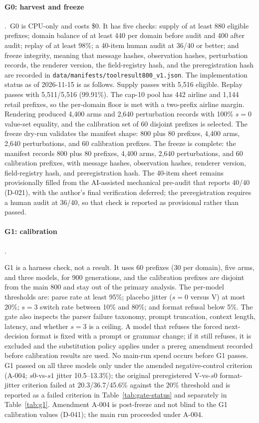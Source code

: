 \documentclass[a4paper,fleqn]{cas-sc}
\begin{document}
\paragraph{G0: harvest and freeze}.\
G0 is CPU-only and costs \$0. It has five checks: supply of at least 880 eligible prefixes;
domain balance of at least 440 per domain before audit and 400 after audit; replay of at least
98\%; a 40-item human audit at 36/40 or better; and freeze integrity, meaning that message hashes,
observation hashes, perturbation records, the renderer version, the field-registry hash, and the
preregistration hash are recorded in \texttt{data/manifests/toolresult800\_v1.json}.
The implementation status as of 2026-11-15 is as follows. Supply passes with 5{,}516 eligible.
Replay passes with 5{,}511/5{,}516 (99.91\%). The cap-10 pool has 442 airline and 1{,}144 retail
prefixes, so the per-domain floor is met with a two-prefix airline margin. Rendering produced
4{,}400 arms and 2{,}640 perturbation records with 100\% $s=0$ value-set equality, and the
calibration set of 60 disjoint prefixes is selected. The freeze dry-run validates the manifest
shape: 800 plus 80 prefixes, 4{,}400 arms, 2{,}640 perturbations, and 60 calibration prefixes.
The freeze is complete: the manifest records 800 plus 80 prefixes, 4,400 arms, 2,640 perturbations,
and 60 calibration prefixes, with message hashes, observation hashes, renderer version,
field-registry hash, and preregistration hash. The 40-item sheet remains provisionally filled from
the AI-assisted mechanical pre-audit that reports 40/40 (D-021), with the author's final
verification deferred; the preregistration requires a human audit at 36/40, so that check is
reported as provisional rather than passed.

\paragraph{G1: calibration}.\

G1 is a harness check, not a result. It uses 60 prefixes (30 per domain), five arms, and three
models, for 900 generations, and the calibration prefixes are disjoint from the main 800 and stay
out of the primary analysis. The per-model thresholds are: parse rate at least 95\%; placebo
jitter ($s=0$ versus V) at most 20\%; $s=3$ switch rate between 10\% and 80\%; and format refusal
below 5\%. The gate also inspects the parser failure taxonomy, prompt truncation, context length,
latency, and whether $s=3$ is a ceiling. A model that refuses the forced next-decision format is
fixed with a prompt or grammar change; if it still refuses, it is excluded and the substitution
policy applies under a prereg amendment recorded before calibration results are used. No
main-run spend occurs before G1 passes. G1 passed on all three models only under the amended
negative-control criterion (A-004; $s0$-vs-$s1$ jitter 10.5--13.3\%); the original preregistered
V-vs-$s0$ format-jitter criterion failed at 20.3/36.7/45.6\% against the 20\% threshold and is
reported as a failed criterion in Table~\ref{tab:gate-status} and separately in
Table~\ref{tab:g1}. Amendment A-004 is post-freeze and not blind to the G1 calibration values
(D-041); the main run proceeded under A-004.
\end{document}
